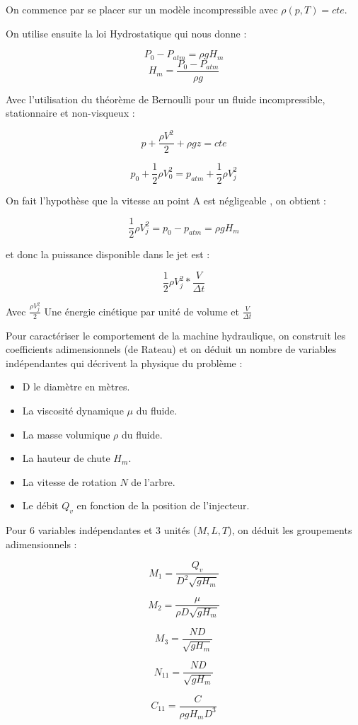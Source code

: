 \documentclass[a4paper,10pt]{report} %
\begin{document}
On commence par se placer sur un modèle incompressible avec $\rho(p,T)=cte$.

On utilise ensuite la loi Hydrostatique qui nous donne :

$$P_0-P_{atm}=\rho g H_m$$
$$H_m=\frac{P_0-P_{atm}}{\rho g}$$

Avec l'utilisation du théorème de Bernoulli pour un fluide incompressible, stationnaire et non-visqueux : 




$$p+\frac{\rho V^2}{2}+\rho g z=cte$$

$$p_0+\frac{1}{2} \rho V_0^2=p_{atm} + \frac{1}{2} \rho V_j^2$$

On fait l'hypothèse que la vitesse au point A est négligeable , on obtient :

$$\frac{1}{2} \rho V_j^2=p_0-p_{atm}=\rho g H_m$$

et donc la puissance disponible dans le jet est :

$$\frac{1}{2} \rho V_j^2 * \frac{V}{\Delta t}$$

Avec $\frac{\rho V_j^2}{2}$ Une énergie cinétique par unité de volume et $\frac{V}{\Delta t}$


Pour caractériser le comportement de la machine hydraulique, on construit les coefficients adimensionnels (de Rateau) et on déduit un nombre de variables indépendantes qui décrivent la physique du problème :

\begin{itemize}
\item D le diamètre en mètres.
\item La viscosité dynamique $\mu$ du fluide.
\item La masse volumique $\rho$ du fluide.
\item La hauteur de chute $H_m$.
\item La vitesse de rotation $N$ de l'arbre.
\item Le débit $Q_v$ en fonction de la position de l'injecteur.
\end{itemize}

Pour 6 variables indépendantes et 3 unités ($M,L,T$), on déduit les groupements adimensionnels :

$$M_1=\frac{Q_v}{D^2 \sqrt{g H_m}}$$

$$M_2=\frac{\mu}{\rho D \sqrt{g H_m}}$$

$$M_3=\frac{N D}{\sqrt{g H_m}}$$

$$N_{11}=\frac{N D }{\sqrt{g H_m}}$$

$$C_{11}=\frac{C}{\rho g H_m D^3}$$ 
\end{document}
